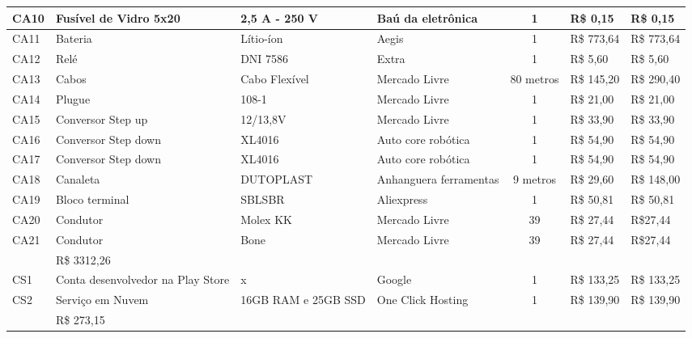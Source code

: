 \begin{table}[H]
\begin{adjustbox}{max width = 1\textwidth}
\begin{tabular}{|l|G{4cm}|C{2.4cm}|L{3.2cm}|c|l|l|}
        CA10 & Fusível de Vidro 5x20  & 2,5 A - 250 V & Baú da eletrônica & 1 & R\$ 0,15  & R\$ 0,15 \\\hline
        CA11 & Bateria  & Lítio-íon & Aegis & 1 & R\$ 773,64  & R\$ 773,64 \\\hline
        CA12 & Relé & DNI 7586 & Extra & 1 & R\$ 5,60  & R\$ 5,60 \\\hline
        CA13 & Cabos & Cabo Flexível & Mercado Livre & 80 metros & R\$ 145,20  & R\$ 290,40 \\\hline
        CA14 & Plugue & 108-1 & Mercado Livre & 1 & R\$ 21,00  & R\$ 21,00 \\\hline
        CA15 & Conversor Step up & 12/13,8V & Mercado Livre & 1 & R\$ 33,90  & R\$ 33,90 \\\hline
        CA16 & Conversor Step down & XL4016  & Auto core robótica & 1 & R\$ 54,90  & R\$ 54,90 \\\hline
        CA17 & Conversor Step down & XL4016  & Auto core robótica & 1 & R\$ 54,90  & R\$ 54,90 \\\hline
        CA18 & Canaleta & DUTOPLAST  & Anhanguera ferramentas & 9 metros & R\$ 29,60  & R\$ 148,00 \\\hline
        CA19 & Bloco terminal & SBLSBR  & Aliexpress & 1 & R\$ 50,81  & R\$ 50,81 \\\hline
        CA20 & Condutor & Molex KK  & Mercado Livre & 39 & R\$ 27,44  & R\$27,44 \\\hline
        CA21 & Condutor & Bone  & Mercado Livre & 39 & R\$ 27,44  & R\$27,44 \\\hline
        
        
         & R\$ 3312,26 \\ \hline
        CS1 & Conta desenvolvedor na Play Store &  x  & Google & 1 & R\$ 133,25 & R\$ 133,25  \\\hline
        CS2 & Serviço em Nuvem  & 16GB RAM e 25GB SSD   & One Click Hosting  & 1  & R\$ 139,90 & R\$ 139,90 \\\hline
         & R\$ 273,15  \\ \hline
        

\end{tabular}
\end{adjustbox}
\end{table}

